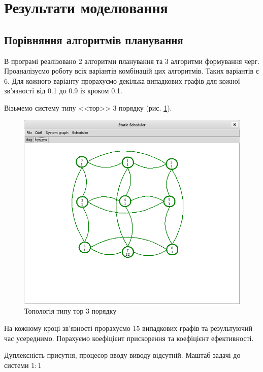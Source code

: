 \section{Результати моделювання}
    \subsection{Порівняння алгоритмів планування}

    В програмі реалізовано 2 алгоритми планування та 3 алгоритми формування черг. Проаналізуємо роботу всіх варіантів комбінацій цих алгоритмів. Таких варіантів є 6. Для кожного варіанту прорахуємо декілька випадкових графів для кожної зв'язності від 0.1 до 0.9 із кроком 0.1.

    Візьмемо систему типу <<тор>> 3 порядку (рис. \ref{fig:thor}).

    \begin{figure}[h!]
      \begin{center}
        \includegraphics[width=\textwidth]{res/thor.png}
      \end{center}
      \caption{Топологія типу тор 3 порядку}
    \label{fig:thor}
    \end{figure}

    На кожному кроці зв'язності прорахуємо 15 випадкових графів та результуючий час усереднимо.
    Порахуємо коефіцієнт прискорення та коефіцієнт ефективності.

    Дуплексність присутня, процесор вводу виводу відсутній. Маштаб задачі до системи $1:1$

